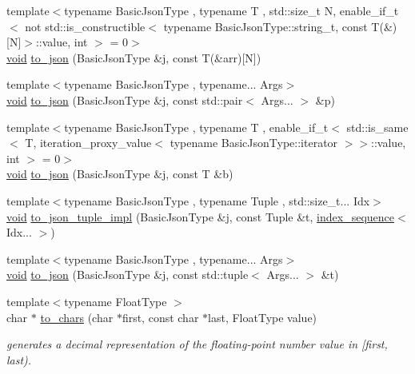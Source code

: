 \begin{DoxyCompactItemize}
\item 
{\footnotesize template$<$typename Basic\+Json\+Type , typename T , std\+::size\+\_\+t N, enable\+\_\+if\+\_\+t$<$ not std\+::is\+\_\+constructible$<$ typename Basic\+Json\+Type\+::string\+\_\+t, const T(\&)\mbox{[}\+N\mbox{]}$>$\+::value, int $>$  = 0$>$ }\\\mbox{\hyperlink{namespacenlohmann_1_1detail_a59fca69799f6b9e366710cb9043aa77d}{void}} \mbox{\hyperlink{namespacenlohmann_1_1detail_a20ea5175c8999fc8b673e46b892f71f6}{to\+\_\+json}} (Basic\+Json\+Type \&j, const T(\&arr)\mbox{[}N\mbox{]})
\item 
{\footnotesize template$<$typename Basic\+Json\+Type , typename... Args$>$ }\\\mbox{\hyperlink{namespacenlohmann_1_1detail_a59fca69799f6b9e366710cb9043aa77d}{void}} \mbox{\hyperlink{namespacenlohmann_1_1detail_aa30611f74062379d3420c40487cf3bb3}{to\+\_\+json}} (Basic\+Json\+Type \&j, const std\+::pair$<$ Args... $>$ \&p)
\item 
{\footnotesize template$<$typename Basic\+Json\+Type , typename T , enable\+\_\+if\+\_\+t$<$ std\+::is\+\_\+same$<$ T, iteration\+\_\+proxy\+\_\+value$<$ typename Basic\+Json\+Type\+::iterator $>$$>$\+::value, int $>$  = 0$>$ }\\\mbox{\hyperlink{namespacenlohmann_1_1detail_a59fca69799f6b9e366710cb9043aa77d}{void}} \mbox{\hyperlink{namespacenlohmann_1_1detail_aaa77b0c9745130b77733a92a1a2e82ec}{to\+\_\+json}} (Basic\+Json\+Type \&j, const T \&b)
\item 
{\footnotesize template$<$typename Basic\+Json\+Type , typename Tuple , std\+::size\+\_\+t... Idx$>$ }\\\mbox{\hyperlink{namespacenlohmann_1_1detail_a59fca69799f6b9e366710cb9043aa77d}{void}} \mbox{\hyperlink{namespacenlohmann_1_1detail_a510dfa15b01e9a8afe31600a27b28199}{to\+\_\+json\+\_\+tuple\+\_\+impl}} (Basic\+Json\+Type \&j, const Tuple \&t, \mbox{\hyperlink{structnlohmann_1_1detail_1_1index__sequence}{index\+\_\+sequence}}$<$ Idx... $>$)
\item 
{\footnotesize template$<$typename Basic\+Json\+Type , typename... Args$>$ }\\\mbox{\hyperlink{namespacenlohmann_1_1detail_a59fca69799f6b9e366710cb9043aa77d}{void}} \mbox{\hyperlink{namespacenlohmann_1_1detail_aa7a47b08eee864c2c108c04954919648}{to\+\_\+json}} (Basic\+Json\+Type \&j, const std\+::tuple$<$ Args... $>$ \&t)
\item 
{\footnotesize template$<$typename Float\+Type $>$ }\\char $\ast$ \mbox{\hyperlink{namespacenlohmann_1_1detail_a18759c536d89c4dd3a118bd3ecb790da}{to\+\_\+chars}} (char $\ast$first, const char $\ast$last, Float\+Type value)
\begin{DoxyCompactList}\small\item\em generates a decimal representation of the floating-\/point number value in \mbox{[}first, last). \end{DoxyCompactList}\end{DoxyCompactItemize}


